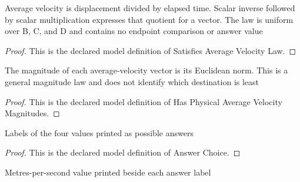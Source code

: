 \begin{definition}
  \label{def:physics:phyx-mini-0737:phyxminiproblems-problemphyxmini0737-satisfiesaveragevelocitylaw}
  Average velocity is displacement divided by elapsed time. Scalar inverse followed by scalar multiplication expresses that quotient for a vector. The law is uniform over B, C, and D and contains no endpoint comparison or answer value
\end{definition}
\begin{proof}
  This is the declared model definition of Satisfies Average Velocity Law.
\end{proof}
\begin{definition}
  \label{def:physics:phyx-mini-0737:phyxminiproblems-problemphyxmini0737-hasphysicalaveragevelocitymagnitudes}
  The magnitude of each average-velocity vector is its Euclidean norm. This is a general magnitude law and does not identify which destination is least
\end{definition}
\begin{proof}
  This is the declared model definition of Has Physical Average Velocity Magnitudes.
\end{proof}
\begin{definition}
  \label{def:physics:phyx-mini-0737:phyxminiproblems-problemphyxmini0737-answerchoice}
  Labels of the four values printed as possible answers
\end{definition}
\begin{proof}
  This is the declared model definition of Answer Choice.
\end{proof}
\begin{definition}
  \label{def:physics:phyx-mini-0737:phyxminiproblems-problemphyxmini0737-answerchoice-displayedmeterspersecond}
  Metres-per-second value printed beside each answer label
\end{definition}
